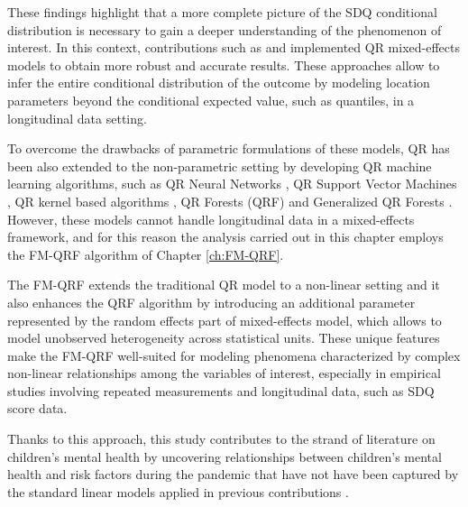 \vspace{0.15in}

\noindent These findings highlight that a more complete picture of the SDQ conditional distribution is necessary to gain a deeper understanding of the phenomenon of interest. In this context, contributions such as \cite{tzavidis2016longitudinal} and \cite{merlo2022quantile} implemented QR mixed-effects models to obtain more robust and accurate results. These approaches allow to infer the entire conditional distribution of the outcome by modeling location parameters beyond the conditional expected value, such as quantiles, in a longitudinal data setting.

\vspace{0.15in}

\noindent To overcome the drawbacks of parametric formulations of these models, QR has been also extended to the non-parametric setting by developing QR machine learning algorithms, such as QR Neural Networks \citep{white1992nonparametric}, QR Support Vector Machines \citep{hwang2005simple, xu2015weighted}, QR kernel based algorithms \citep{christmann2008consistency}, QR Forests (QRF) \citep{meinshausen2006quantile} and Generalized QR Forests 
\citep{ athey2019generalized}. However, these models cannot handle longitudinal data in a mixed-effects framework, and for this reason the analysis carried out in this chapter employs the FM-QRF algorithm of Chapter \ref{ch:FM-QRF}. 

\vspace{0.15in}

\noindent The FM-QRF extends the traditional QR model to a non-linear setting and it also enhances the QRF algorithm by introducing an additional parameter represented by the random effects part of mixed-effects model, which allows to model unobserved heterogeneity across statistical units. These unique features make the FM-QRF well-suited for modeling phenomena characterized by complex non-linear relationships among the variables of interest, especially in empirical studies involving repeated measurements and longitudinal data, such as SDQ score data.

\vspace{0.15in}

\noindent Thanks to this approach, this study contributes to the strand of literature on children's mental health by uncovering relationships between children's mental health and risk factors during the pandemic that have not have been captured by the standard linear models applied in previous contributions \citep{walton2010contextual,goodnight2012quasi,bradley2002socioeconomic}.

